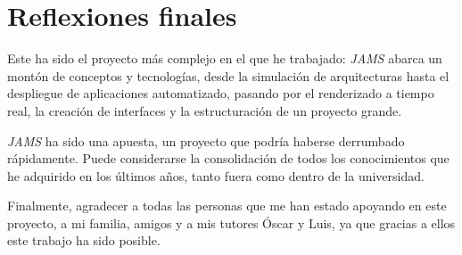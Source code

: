 \section{Reflexiones finales}\label{sec:reflexiones-finales}

Este ha sido el proyecto más complejo en el que he trabajado:
\textit{JAMS} abarca un montón de conceptos y tecnologías,
desde la simulación de arquitecturas hasta el despliegue de
aplicaciones automatizado, pasando por el renderizado a tiempo
real, la creación de interfaces y la estructuración de un
proyecto grande.

\textit{JAMS} ha sido una apuesta, un proyecto
que podría haberse derrumbado rápidamente.
Puede considerarse la consolidación de todos los conocimientos
que he adquirido en los últimos años, tanto fuera como dentro
de la universidad.

Finalmente, agradecer a todas las personas que me han
estado apoyando en este proyecto, a mi familia, amigos y a mis
tutores Óscar y Luis, ya que gracias a ellos este trabajo
ha sido posible.
